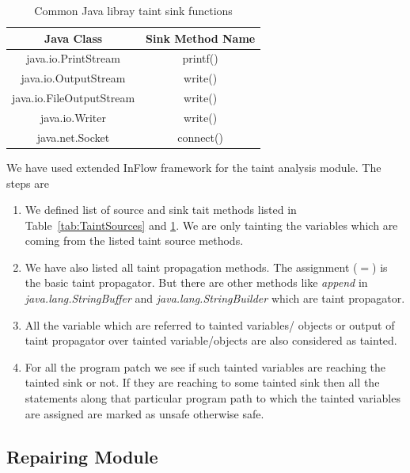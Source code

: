 \begin{table}[!htb]
\centering
\caption{Common Java libray taint sink functions}
\label{tab:TaintSinks}
\scalebox{0.86}
{
\begin{tabular}{|c|c|}
\hline

 \textbf{Java Class} & \textbf{Sink Method Name}\\
 \hline java.io.PrintStream & printf()\\ \hline
 java.io.OutputStream & write()\\ \hline
 java.io.FileOutputStream & write()\\ \hline
 java.io.Writer & write()\\ \hline
 java.net.Socket & connect()\\ \hline

\end{tabular}
}
\end{table}


We have used extended InFlow framework for the taint analysis module. The steps
are

\begin{enumerate}
  \item We defined list of source and sink tait methods listed in
  Table~\ref{tab:TaintSources} and \ref{tab:TaintSinks}. We are only tainting
  the variables which are coming from the listed taint source methods.
  \item We have also listed all taint propagation methods. The assignment ($=$)
  is the basic taint propagator. But there are other methods like \emph{append}
  in \emph{java.lang.StringBuffer} and \emph{java.lang.StringBuilder} which are
  taint propagator.
  \item All the variable which are referred to tainted variables/ objects or
  output of taint propagator over tainted variable/objects are also considered
  as tainted.
  \item For all the program patch we see if such tainted variables are reaching
  the tainted sink or not. If they are reaching to some tainted sink then all
  the statements along that particular program path to which the tainted
  variables are assigned are marked as unsafe otherwise safe.
\end{enumerate}


\subsection{Repairing Module}
\label{subsec:RepairingModule}

